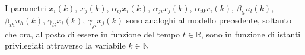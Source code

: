 \begin{center}
\end{center}
I parametri \(x_i(k)\), \(x_j(k)\), \(\alpha_{ij} x_i(k)\), \(\alpha_{ji} x_j(k)\), \(\alpha_{i0} x_i(k)\), \(\beta_{li} u_l(k)\), \(\beta_{ih} u_h(k)\),
\(\gamma_{ii} x_i(k)\), \(\gamma_{ji} x_j(k)\) sono analoghi al modello precedente, soltanto che ora, al posto di essere in funzione
del tempo \(t \in \mathbb{R}\), sono in funzione di istanti privilegiati attraverso la variabile \(k \in \mathbb{N}\)

